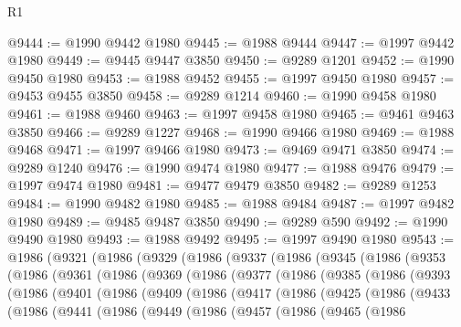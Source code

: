 \begin{lexlean}{R1}
\begin{coremodule}
@9444 := @1990 @9442 @1980
@9445 := @1988 @9444
@9447 := @1997 @9442 @1980
@9449 := @9445 @9447 @3850
@9450 := @9289 @1201
@9452 := @1990 @9450 @1980
@9453 := @1988 @9452
@9455 := @1997 @9450 @1980
@9457 := @9453 @9455 @3850
@9458 := @9289 @1214
@9460 := @1990 @9458 @1980
@9461 := @1988 @9460
@9463 := @1997 @9458 @1980
@9465 := @9461 @9463 @3850
@9466 := @9289 @1227
@9468 := @1990 @9466 @1980
@9469 := @1988 @9468
@9471 := @1997 @9466 @1980
@9473 := @9469 @9471 @3850
@9474 := @9289 @1240
@9476 := @1990 @9474 @1980
@9477 := @1988 @9476
@9479 := @1997 @9474 @1980
@9481 := @9477 @9479 @3850
@9482 := @9289 @1253
@9484 := @1990 @9482 @1980
@9485 := @1988 @9484
@9487 := @1997 @9482 @1980
@9489 := @9485 @9487 @3850
@9490 := @9289 @590
@9492 := @1990 @9490 @1980
@9493 := @1988 @9492
@9495 := @1997 @9490 @1980
@9543 := @1986
    (@9321
      (@1986
        (@9329
          (@1986
            (@9337
              (@1986
                (@9345
                  (@1986
                    (@9353
                      (@1986
                        (@9361
                          (@1986
                            (@9369
                              (@1986
                                (@9377
                                  (@1986
                                    (@9385
                                      (@1986
                                        (@9393
                                          (@1986
                                            (@9401
                                              (@1986
                                                (@9409
                                                  (@1986
                                                    (@9417
                                                      (@1986
                                                        (@9425
                                                          (@1986
                                                            (@9433
                                                              (@1986
                                                                (@9441
                                                                  (@1986
                                                                    (@9449
                                                                      (@1986
                                                                        (@9457
                                                                          (@1986
                                                                            (@9465
                                                                              (@1986

\end{coremodule}
\end{lexlean}
